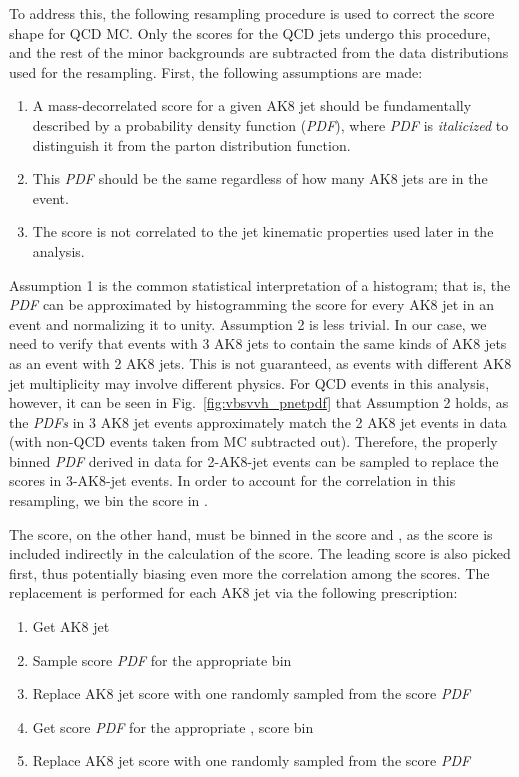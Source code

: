 To address this, the following resampling procedure is used to correct the \ParticleNet score shape for QCD MC. 
Only the scores for the QCD jets undergo this procedure, and the rest of the minor backgrounds are subtracted from the data distributions used for the resampling.
First, the following assumptions are made:
\begin{enumerate}
    \item A mass-decorrelated \ParticleNet score for a given AK8 jet should be fundamentally described by a probability density function (\textit{PDF}), where \textit{PDF} is \textit{italicized} to distinguish it from the parton distribution function.
    \item This \textit{PDF} should be the same regardless of how many AK8 jets are in the event.
    \item The \ParticleNet score is not correlated to the jet kinematic properties used later in the analysis. 
\end{enumerate}
Assumption 1 is the common statistical interpretation of a histogram; that is, the \textit{PDF} can be approximated by histogramming the \ParticleNet score for every AK8 jet in an event and normalizing it to unity. 
Assumption 2 is less trivial. 
In our case, we need to verify that events with 3 AK8 jets to contain the same kinds of AK8 jets as an event with 2 AK8 jets. 
This is not guaranteed, as events with different AK8 jet multiplicity may involve different physics. 
For QCD events in this analysis, however, it can be seen in Fig.~\ref{fig:vbsvvh_pnetpdf} that Assumption 2 holds, as the \textit{PDFs} in 3 AK8 jet events approximately match the 2 AK8 jet events in data (with non-QCD events taken from MC subtracted out).
Therefore, the properly binned \textit{PDF} derived in data for 2-AK8-jet events can be sampled to replace the \ParticleNet scores in 3-AK8-jet events. 
In order to account for the correlation in this resampling, we bin the \ParticleNet \Xtobb score in \pt. 

The \ParticleNet \XWtoqq score, on the other hand, must be binned in the \Xtobb score and \pt, as the \Xtobb score is included indirectly in the calculation of the \XWtoqq score. 
The leading \Xtobb score is also picked first, thus potentially biasing even more the correlation among the scores.
The replacement is performed for each AK8 jet via the following prescription:
\begin{enumerate}
    \item Get AK8 jet \pt
    \item Sample \Xtobb score \textit{PDF} for the appropriate \pt bin
    \item Replace AK8 jet \Xtobb score with one randomly sampled from the \Xtobb score \textit{PDF}
    \item Get \XWtoqq score \textit{PDF} for the appropriate \pt, \Xtobb score bin
    \item Replace AK8 jet \XWtoqq score with one randomly sampled from the \XWtoqq score \textit{PDF}
\end{enumerate}

